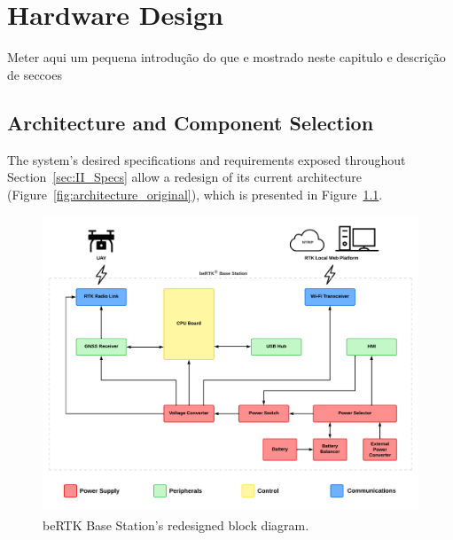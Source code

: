 

\chapter{Hardware Design}\label{cha:chapter3_HardwareDesign}

Meter aqui um pequena introdução do que e mostrado neste capitulo e descrição de seccoes

\section{Architecture and Component Selection}\label{sec:31_Architecture}

The system's desired specifications and requirements exposed throughout Section~\ref{sec:II_Specs} allow a redesign of its current architecture (Figure~\ref{fig:architecture_original}), which is presented in Figure~\ref{fig:architecture_new}.

\begin{figure}[h]
	\centering
	\includegraphics[width=1.0\textwidth]{Chapters/Figures/new_architecture_2.pdf}
	\caption{beRTK\textsuperscript{\textregistered} Base Station's redesigned block diagram.}
	\label{fig:architecture_new}
\end{figure}

